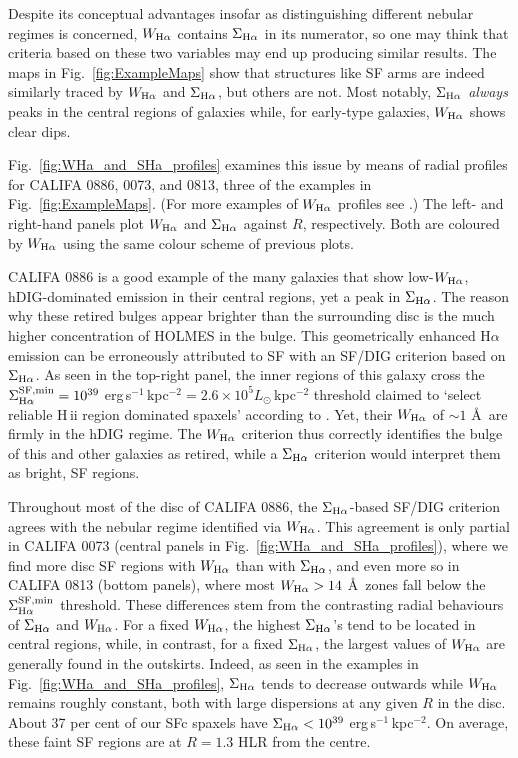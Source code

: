 \documentclass[a4paper, fleqn, usenatbib, useAMS]{mnras}
\newcommand{\Ha}{\ifmmode {\rm H}\alpha \else H$\alpha$\fi\xspace}
\newcommand{\hii}{H\,{\sc ii}\xspace}
\begin{document}
Despite its conceptual advantages insofar as distinguishing different nebular regimes is concerned, $W_{\Ha}$ contains $\Sigma_{\Ha}$ in its numerator, so  one may think that criteria based on these two variables may end up producing similar results. The maps in Fig.\ \ref{fig:ExampleMaps}  show that structures like SF arms are indeed similarly traced by $W_{\Ha}$ and $\Sigma_{\Ha}$, but others are not. Most notably, $\Sigma_{\Ha}$ \textit{always} peaks in the central regions of galaxies while, for early-type galaxies, $W_{\Ha}$ shows clear dips.

Fig.\ \ref{fig:WHa_and_SHa_profiles} examines this issue by means of radial profiles for CALIFA 0886, 0073, and 0813, three of the examples in Fig.\ \ref{fig:ExampleMaps}. (For more examples of $W_{\Ha}$ profiles see \citealt{Papaderos.etal.2013, Belfiore.etal.2016, Belfiore.etal.2017, Gomes.etal.2016b, GonzalezDelgado.etal.2016a}.) The left- and right-hand panels plot $W_{\Ha}$ and $\Sigma_{\Ha}$ against $R$, respectively. Both are coloured by $W_{\Ha}$ using the same colour scheme of previous plots.

CALIFA 0886 is a good example of the many galaxies that show low-$W_{\Ha}$, hDIG-dominated emission in their central regions, yet a peak in $\Sigma_{\Ha}$. The reason why these retired bulges appear brighter than the surrounding disc is the much higher concentration of HOLMES in the bulge. This geometrically enhanced \Ha emission can be erroneously attributed to SF with an SF/DIG criterion based on $\Sigma_{\Ha}$. As seen in the top-right panel, the inner regions of this galaxy cross the $\Sigma^{\rm SF,min}_{\Ha} = 10^{39}$ erg$\,$s$^{-1}\,$kpc$^{-2} =  2.6 \times 10^{5} L_\odot\,$kpc$^{-2}$ threshold claimed to `select reliable \hii region dominated spaxels' according to \citet{Zhang.etal.2017a}. Yet, their $W_{\Ha}$ of $\sim 1$ \AA\ are firmly in the hDIG regime. The $W_{\Ha}$ criterion thus correctly identifies the bulge of this and other galaxies as retired, while a  $\Sigma_{\Ha}$ criterion would interpret them as bright, SF regions.

Throughout most of the disc of CALIFA 0886, the \citet{Zhang.etal.2017a} $\Sigma_{\Ha}$-based SF/DIG criterion agrees with the nebular regime identified via $W_{\Ha}$. This agreement is only partial in CALIFA 0073 (central panels in Fig.\ \ref{fig:WHa_and_SHa_profiles}), where we find more disc SF regions with $W_{\Ha}$ than with $\Sigma_{\Ha}$, and even more so in CALIFA 0813 (bottom panels), where most $W_{\Ha} > 14$ \AA\ zones  fall below the $\Sigma^{\rm SF,min}_{\Ha}$ threshold. These differences stem from the contrasting radial behaviours of $\Sigma_{\Ha}$ and $W_{\Ha}$. For a fixed $W_{\Ha}$, the highest $\Sigma_{\Ha}$'s tend to be located in central regions, while, in contrast, for a fixed $\Sigma_{\Ha}$, the largest values of $W_{\Ha}$ are generally found in the outskirts. Indeed, as seen in the examples in Fig.\ \ref{fig:WHa_and_SHa_profiles}, $\Sigma_{\Ha}$ tends to decrease outwards while $W_{\Ha}$ remains roughly constant, both with large dispersions at any given $R$ in the disc. About 37 per cent of our SFc spaxels have $\Sigma_{\Ha} < 10^{39}$ erg$\,$s$^{-1}\,$kpc$^{-2}$. On average, these faint SF regions are at $R = 1.3$ HLR from the centre.
\end{document}
